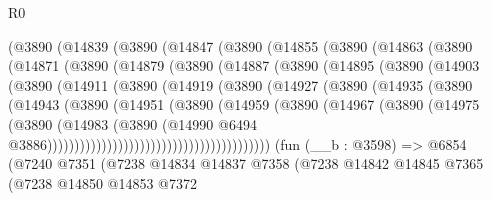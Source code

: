\begin{lexlean}{R0}
\begin{coremodule}
      (@3890
        (@14839
          (@3890
            (@14847
              (@3890
                (@14855
                  (@3890
                    (@14863
                      (@3890
                        (@14871
                          (@3890
                            (@14879
                              (@3890
                                (@14887
                                  (@3890
                                    (@14895
                                      (@3890
                                        (@14903
                                          (@3890
                                            (@14911
                                              (@3890
                                                (@14919
                                                  (@3890
                                                    (@14927
                                                      (@3890
                                                        (@14935
                                                          (@3890
                                                            (@14943
                                                              (@3890
                                                                (@14951
                                                                  (@3890
                                                                    (@14959
                                                                      (@3890
                                                                        (@14967
                                                                          (@3890
                                                                            (@14975
                                                                              (@3890
                                                                                (@14983
                                                                                  (@3890
                                                                                    (@14990
                                                                                      @6494
                                                                                      @3886)))))))))))))))))))))))))))))))))))))))))
    (fun (__b : @3598) =>
    @6854
      (@7240
        @7351
        (@7238
          @14834
          @14837
          @7358
          (@7238
            @14842
            @14845
            @7365
            (@7238
              @14850
              @14853
              @7372

\end{coremodule}
\end{lexlean}
